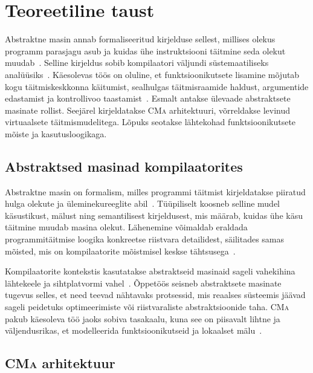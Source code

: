 ﻿\section{Teoreetiline taust}\label{taust}

Abstraktne masin annab formaliseeritud kirjelduse sellest, millises olekus programm parasjagu asub ja kuidas ühe instruktsiooni täitmine seda olekut muudab~\cite{wilhelm_imperative_2010}. Selline kirjeldus sobib kompilaatori väljundi süstemaatiliseks analüüsiks~\cite{mogensen_introduction_2024}. Käesolevas töös on oluline, et funktsioonikutsete lisamine mõjutab kogu täitmiskeskkonna käitumist, sealhulgas täitmisraamide haldust, argumentide edastamist ja kontrollivoo taastamist~\cite{mogensen_programming_2026}. Esmalt antakse ülevaade abstraktsete masinate rollist. Seejärel kirjeldatakse \textsc{CMa} arhitektuuri, võrreldakse levinud virtuaalsete täitmismudelitega. Lõpuks seotakse lähtekohad funktsioonikutsete mõiste ja kasutusloogikaga.

\subsection{Abstraktsed masinad kompilaatorites}\label{taust:abstraktsed}

Abstraktne masin on formalism, milles programmi täitmist kirjeldatakse piiratud hulga olekute ja üleminekureeglite abil~\cite{wilhelm_imperative_2010}. Tüüpiliselt koosneb selline mudel käsustikust, mälust ning semantilisest kirjeldusest, mis määrab, kuidas ühe käsu täitmine muudab masina olekut. Lähenemine võimaldab eraldada programmitäitmise loogika konkreetse riistvara detailidest, säilitades samas mõisted, mis on kompilaatorite mõistmisel keskse tähtsusega~\cite{mogensen_introduction_2024}.

Kompilaatorite kontekstis kasutatakse abstraktseid masinaid sageli vahekihina lähtekeele ja sihtplatvormi vahel~\cite{wilhelm_compiler_2013}. Õppetöös seisneb abstraktsete masinate tugevus selles, et need teevad nähtavaks protsessid, mis reaalses süsteemis jäävad sageli peidetuks optimeerimiste või riistvaraliste abstraktsioonide taha. \textsc{CMa} pakub käesoleva töö jaoks sobiva tasakaalu, kuna see on piisavalt lihtne ja väljendusrikas, et modelleerida funktsioonikutseid ja lokaalset mälu~\cite{wilhelm_imperative_2010}.

\subsection{\textsc{CMa} arhitektuur}\label{taust:CMa}

